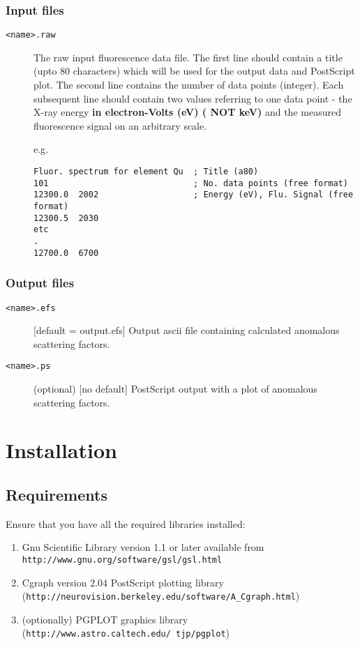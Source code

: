 \documentclass[a4paper]{article}
\begin{document}
\subsubsection*{Input files}

\begin{description}
\item[{\tt <name>.raw}] The raw input fluorescence data file. The
first line should contain a title (upto 80 characters) which will be
used for the output data and PostScript plot. The second line contains
the number of data points (integer). Each subsequent line should
contain two values referring to one data point - the X-ray energy {\bf
in electron-Volts (eV) ( NOT keV)} and the measured fluorescence
signal on an arbitrary scale.

e.g.
\begin{verbatim}
Fluor. spectrum for element Qu  ; Title (a80)
101                             ; No. data points (free format)
12300.0  2002                   ; Energy (eV), Flu. Signal (free format)
12300.5  2030
etc
.
12700.0  6700
\end{verbatim}
\end{description}

\subsubsection*{Output files}

\begin{description}
\item[{\tt <name>.efs}] [default = output.efs] Output ascii file containing calculated
anomalous scattering factors.
\item[{\tt <name>.ps}] (optional) [no default] PostScript output with a plot of
anomalous scattering factors.
\end{description}

\section*{Installation}

\subsection*{Requirements}

Ensure that you have all the required libraries installed:
\begin{enumerate}
\item Gnu Scientific Library version 1.1 or later available from
{\tt http://www.gnu.org/software/gsl/gsl.html}
\item Cgraph version 2.04 PostScript plotting library ({\tt http://neurovision.berkeley.edu/software/A\_Cgraph.html})
\item (optionally) PGPLOT graphics library 
({\tt http://www.astro.caltech.edu/~tjp/pgplot})
\end{enumerate}
\end{document}
